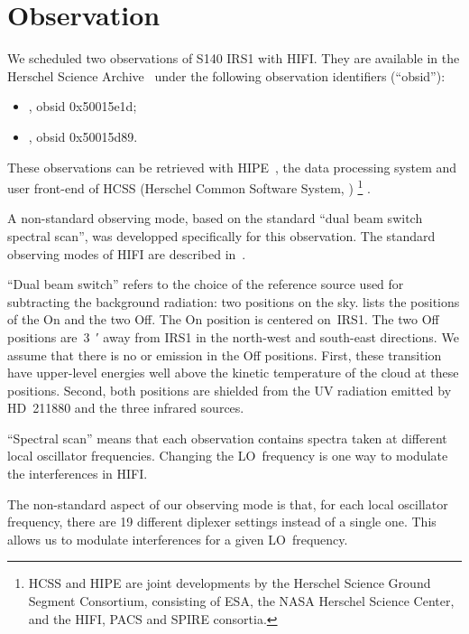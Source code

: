 \FloatBarrier
\section{Observation}

We scheduled two observations of S140 IRS1 with HIFI.
They are available in the Herschel Science Archive~\parencite{herschelsciencearchive2015} under the following observation identifiers (``obsid''):
\begin{itemize}[noitemsep,nolistsep]
    \item {}, obsid 0x50015e1d;
    \item {}, obsid 0x50015d89.
\end{itemize}
These observations can be retrieved with HIPE~\parencite{ott2010herschel}, the data processing system and user front-end of HCSS
(Herschel Common Software System, \textcite{riedinger2009making})%
\footnote{
    HCSS and HIPE are joint developments by the Herschel Science Ground Segment Consortium, consisting of ESA, the NASA Herschel Science Center, and the HIFI, PACS and SPIRE consortia.
}%
.

A non-standard observing mode, based on the standard ``dual beam switch spectral scan'', was developped specifically for this observation.
The standard observing modes of HIFI are described in~\textcite{hifiobserversmanual}.

``Dual beam switch'' refers to the choice of the reference source used for subtracting the background radiation: two positions on the sky.
 lists the positions of the On and the two Off.
The On position is centered on~IRS1.
The two Off positions are~\SI{3}{\arcmin} away from IRS1 in the north-west and south-east directions.
We assume that there is no  or  emission in the Off positions.
First, these transition have upper-level energies well above the kinetic temperature of the cloud at these positions.
Second, both positions are shielded from the UV radiation emitted by HD~211880 and the three infrared sources.

``Spectral scan'' means that each observation contains spectra taken at different local oscillator frequencies.
Changing the LO~frequency is one way to modulate the interferences in HIFI.

The non-standard aspect of our observing mode is that, for each local oscillator frequency, there are 19 different diplexer settings instead of a single one.
This allows us to modulate interferences for a given LO~frequency.

